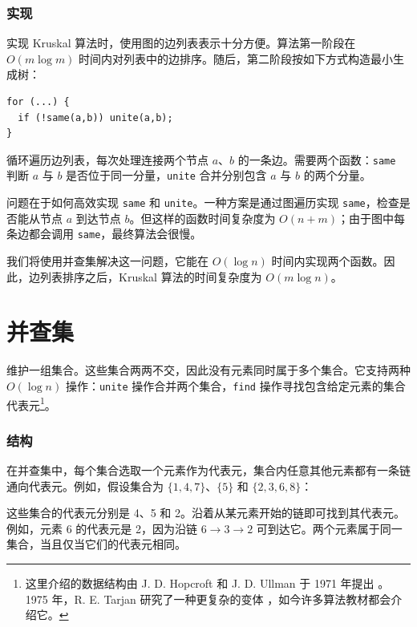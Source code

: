 \subsubsection{实现}

实现 Kruskal 算法时，使用图的边列表表示十分方便。算法第一阶段在 $O(m\log m)$ 时间内对列表中的边排序。随后，第二阶段按如下方式构造最小生成树：

\begin{lstlisting}
for (...) {
  if (!same(a,b)) unite(a,b);
}
\end{lstlisting}

循环遍历边列表，每次处理连接两个节点 $a$、$b$ 的一条边。需要两个函数：\texttt{same} 判断 $a$ 与 $b$ 是否位于同一分量，\texttt{unite} 合并分别包含 $a$ 与 $b$ 的两个分量。

问题在于如何高效实现 \texttt{same} 和 \texttt{unite}。一种方案是通过图遍历实现 \texttt{same}，检查是否能从节点 $a$ 到达节点 $b$。但这样的函数时间复杂度为 $O(n+m)$；由于图中每条边都会调用 \texttt{same}，最终算法会很慢。

我们将使用并查集解决这一问题，它能在 $O(\log n)$ 时间内实现两个函数。因此，边列表排序之后，Kruskal 算法的时间复杂度为 $O(m\log n)$。

\section{并查集}


维护一组集合。这些集合两两不交，因此没有元素同时属于多个集合。它支持两种 $O(\log n)$ 操作：\texttt{unite} 操作合并两个集合，\texttt{find} 操作寻找包含给定元素的集合代表元\footnote{这里介绍的数据结构由 J. D. Hopcroft 和 J. D. Ullman 于 1971 年提出 \cite{hop71}。1975 年，R. E. Tarjan 研究了一种更复杂的变体 \cite{tar75}，如今许多算法教材都会介绍它。}。

\subsubsection{结构}

在并查集中，每个集合选取一个元素作为代表元，集合内任意其他元素都有一条链通向代表元。例如，假设集合为 $\{1,4,7\}$、$\{5\}$ 和 $\{2,3,6,8\}$：
\begin{center}
\end{center}
这些集合的代表元分别是 4、5 和 2。沿着从某元素开始的链即可找到其代表元。例如，元素 6 的代表元是 2，因为沿链 $6 \rightarrow 3 \rightarrow 2$ 可到达它。两个元素属于同一集合，当且仅当它们的代表元相同。

